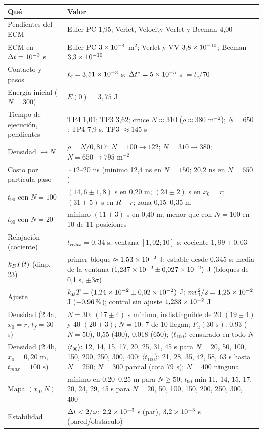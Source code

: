 \documentclass[10.5pt,a4paper]{article}
\begin{document}
\begin{center}\small
\begin{longtable}{@{}p{3.6cm}p{12.4cm}@{}}
\toprule
Qué & Valor \\ \midrule
\endhead
Pendientes del ECM & Euler PC 1,95; Verlet, Velocity Verlet y Beeman 4,00 \\
ECM en $\Delta t=10^{-3}$ s & Euler PC $3\times10^{-4}$ m$^2$; Verlet y VV $3{,}8\times10^{-10}$; Beeman $3{,}3\times10^{-10}$ \\
Contacto y pasos & $t_c=3{,}51\times10^{-3}$ s; $\Delta t^{*}=5\times10^{-5}$ s $=t_c/70$ \\
Energía inicial ($N=300$) & $E(0)=3{,}75$ J \\
Tiempo de ejecución, pendientes & TP4 1,01; TP3 3,62; cruce $N\approx310$ ($\rho\approx380$ m$^{-2}$); $N=650$: TP4 7,9 s, TP3 $\approx145$ s \\
Densidad $\leftrightarrow N$ & $\rho=N/0{,}817$: $N=100\to122$; $N=310\to380$; $N=650\to795$ m$^{-2}$ \\
Costo por partícula-paso & $\sim12$--20 ns (mínimo 12,4 ns en $N=150$; 20,2 ns en $N=650$) \\
$t_{90}$ con $N=100$ & $(14{,}6\pm1{,}8)$ s en 0,20 m; $(24\pm2)$ s en $x_0=r$; $(31\pm5)$ s en $R-r$; zona 0,15--0,35 m \\
$t_{90}$ con $N=20$ & mínimo $(11\pm3)$ s en 0,40 m; menor que con $N=100$ en 10 de 11 posiciones \\
Relajación (cociente) & $t_{relax}=0{,}34$ s; ventana $[1{,}02;10]$ s; cociente $1{,}99\pm0{,}03$ \\
$k_BT(t)$ (diap. 23) & primer bloque $\approx1{,}53\times10^{-2}$ J; estable desde 0,345 s; media de la ventana $(1{,}237\times10^{-2}\pm0{,}027\times10^{-2})$ J (bloques de 0,1 s, $\pm3\sigma$) \\
Ajuste & $k_BT=(1{,}24\times10^{-2}\pm0{,}02\times10^{-2})$ J; $mv_0^2/2=1{,}25\times10^{-2}$ J ($-0{,}96\,\pc$); control sin ajuste $1{,}233\times10^{-2}$ J \\
Densidad (2.4a, $x_0=r$, $t_f=30$ s) & $N=30$: $(17\pm4)$ s mínimo, indistinguible de 20 $(19\pm4)$ y 40 $(20\pm3)$; $N=10$: 7 de 10 llegan; $F_u(30\text{ s})$: 0,93 ($N=50$), 0,55 (400), 0,018 (650); $\langle t_{100}\rangle$ censurado en todo $N$ \\
Densidad (2.4b, $x_0=0{,}20$ m, $t_{max}=100$ s) & $\langle t_{90}\rangle$: 12, 14, 15, 17, 20, 25, 31, 45 s para $N=20$, 50, 100, 150, 200, 250, 300, 400; $\langle t_{100}\rangle$: 21, 28, 35, 42, 58, 63 s hasta $N=250$; $N=300$ parcial (cota 79 s); $N=400$ ninguna \\
Mapa $(x_0,N)$ & mínimo en 0,20--0,25 m para $N\ge50$; $t_{90}$ mín 11, 14, 15, 17, 20, 24, 29, 45 s para $N=20$, 50, 100, 150, 200, 250, 300, 400 \\
Estabilidad & $\Delta t<2/\omega$: $2{,}2\times10^{-3}$ s (par), $3{,}2\times10^{-3}$ s (pared/obstáculo) \\ \bottomrule
\end{longtable}
\end{center}
\end{document}
